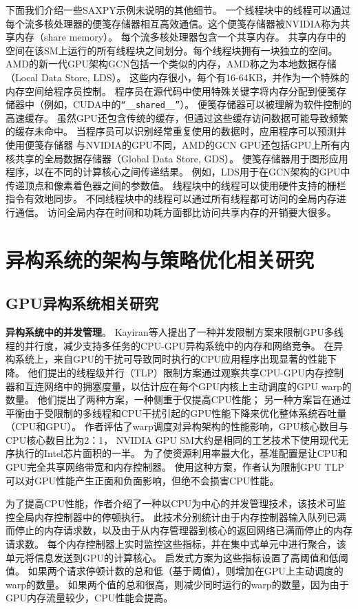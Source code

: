 下面我们介绍一些SAXPY示例未说明的其他细节。
一个线程块中的线程可以通过每个流多核处理器的便笺存储器相互高效通信。这个便笺存储器被NVIDIA称为共享内存（share memory）。
每个流多核处理器包含一个共享内存。
共享内存中的空间在该SM上运行的所有线程块之间划分。每个线程块拥有一块独立的空间。
AMD的新一代GPU架构GCN包括一个类似的内存，AMD称之为本地数据存储（Local Data Store, LDS）。
这些内存很小，每个有16-64KB，并作为一个特殊的内存空间给程序员控制。
程序员在源代码中使用特殊关键字将内存分配到便笺存储器中（例如，CUDA中的\texttt{“\_\_shared\_\_”}）。
便笺存储器可以被理解为软件控制的高速缓存。
虽然GPU还包含传统的缓存，但通过这些缓存访问数据可能导致频繁的缓存未命中。
当程序员可以识别经常重复使用的数据时，应用程序可以预测并使用便笺存储器
与NVIDIA的GPU不同，AMD的GCN GPU还包括GPU上所有内核共享的全局数据存储器（Global Data Store, GDS）。
便笺存储器用于图形应用程序，以在不同的计算核心之间传递结果。
例如，LDS用于在GCN架构的GPU中传递顶点和像素着色器之间的参数值。
线程块中的线程可以使用硬件支持的栅栏指令有效地同步。 
不同线程块中的线程可以通过所有线程都可访问的全局内存进行通信。 
访问全局内存在时间和功耗方面都比访问共享内存的开销要大很多。



\section{异构系统的架构与策略优化相关研究}

\subsection{GPU异构系统相关研究}

\textbf{异构系统中的并发管理}。 
Kayiran等人提出了一种并发限制方案来限制GPU多线程的并行度，减少支持多任务的CPU-GPU异构系统中的内存和网络竞争。
在异构系统上，来自GPU的干扰可导致同时执行的CPU应用程序出现显著的性能下降。
他们提出的线程级并行（TLP）限制方案通过观察共享CPU-GPU内存控制器和互连网络中的拥塞度量，以估计应在每个GPU内核上主动调度的GPU warp的数量。
他们提出了两种方案，一种侧重于仅提高CPU性能；
另一种方案旨在通过平衡由于受限制的多线程和CPU干扰引起的GPU性能下降来优化整体系统吞吐量（CPU和GPU）。
作者评估了warp调度对异构架构的性能影响，GPU核心数目与CPU核心数目比为2：1，
NVIDIA GPU SM大约是相同的工艺技术下使用现代无序执行的Intel芯片面积的一半。
为了使资源利用率最大化，基准配置是让CPU和GPU完全共享网络带宽和内存控制器。
使用这种方案，作者认为限制GPU TLP可以对GPU性能产生正面和负面影响，但绝不会损害CPU性能。

为了提高CPU性能，作者介绍了一种以CPU为中心的并发管理技术，该技术可监控全局内存控制器中的停顿执行。
此技术分别统计由于内存控制器输入队列已满而停止的内存请求数，以及由于从内存管理器到核心的返回网络已满而停止的内存请求数。 
每个内存控制器上实时监控这些指标，并在集中式单元中进行聚合，该单元将信息发送到GPU的计算核心。
启发式方案为这些指标设置了高阈值和低阈值。 
如果两个请求停顿计数的总和低（基于阈值），则增加在GPU上主动调度的warp的数量。 
如果两个值的总和很高，则减少同时运行的warp的数量，因为由于GPU内存流量较少，CPU性能会提高。

